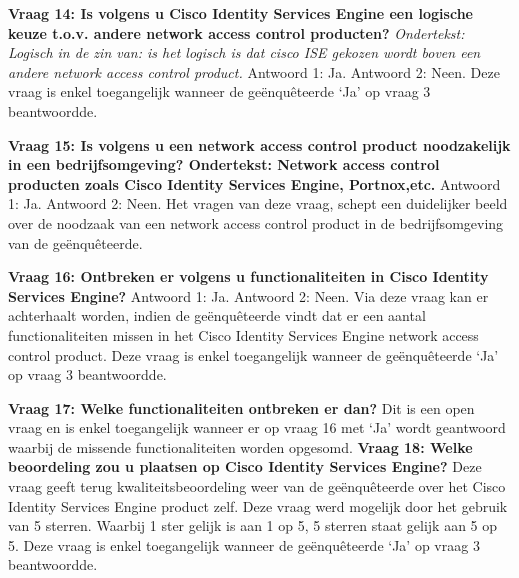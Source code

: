 \begin{itemize}
\textbf{Vraag 14: Is volgens u Cisco Identity Services Engine een logische keuze t.o.v. andere network access control producten?} 
\newline
\textit{Ondertekst: Logisch in de zin van: is het logisch is dat cisco ISE gekozen wordt boven een andere network access control product.}\newline
Antwoord 1: Ja. \newline
Antwoord 2: Neen. \newline \newline
Deze vraag is enkel toegangelijk wanneer de geënquêteerde ‘Ja’ op vraag 3 beantwoordde.\newline

\newpage
\textbf{Vraag 15: Is volgens u een network access control product noodzakelijk in een bedrijfsomgeving? Ondertekst: Network access control producten zoals Cisco Identity Services Engine, Portnox,etc.}
\newline
Antwoord 1: Ja. \newline
Antwoord 2: Neen. \newline \newline
Het vragen van deze vraag, schept een duidelijker beeld over de noodzaak van een network access control product in de bedrijfsomgeving van de geënquêteerde.

\textbf{Vraag 16: Ontbreken er volgens u functionaliteiten in Cisco Identity Services Engine?}
\newline
Antwoord 1: Ja.\newline
Antwoord 2: Neen.\newline \newline
Via deze vraag kan er achterhaalt worden, indien de geënquêteerde vindt dat er een aantal functionaliteiten missen in het Cisco Identity Services Engine network access control product. Deze vraag is enkel toegangelijk wanneer de geënquêteerde ‘Ja’ op vraag 3 beantwoordde.

\textbf{Vraag 17: Welke functionaliteiten ontbreken er dan?}
\newline
Dit is een open vraag en is enkel toegangelijk wanneer er op vraag 16 met ‘Ja’ wordt geantwoord waarbij de missende functionaliteiten worden opgesomd.  
\newline
\newline
\textbf{Vraag 18: Welke beoordeling zou u plaatsen op Cisco Identity Services Engine?}
\newline 
Deze vraag geeft terug kwaliteitsbeoordeling weer van de geënquêteerde over het Cisco Identity Services Engine product zelf. Deze vraag werd mogelijk door het gebruik van 5 sterren. Waarbij 1 ster gelijk is aan 1 op 5, 5 sterren staat gelijk aan 5 op 5. Deze vraag is enkel toegangelijk wanneer de geënquêteerde ‘Ja’ op vraag 3 beantwoordde.


\end{itemize}
